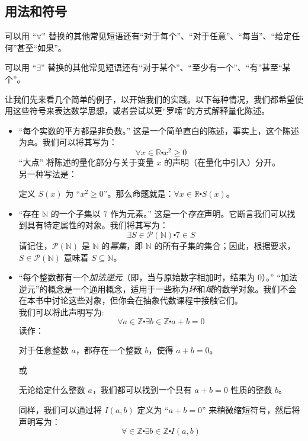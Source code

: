 \subsection{用法和符号}

可以用 ``$\forall$'' 替换的其他常见短语还有``对于每个''、``对于任意''、``每当''、``给定任何''甚至``如果''。

可以用 ``$\exists$'' 替换的其他常见短语还有``对于某个''、``至少有一个''、``有''甚至``某个''。\\

\begin{example}
    让我们先来看几个简单的例子，以开始我们的实践。以下每种情况，我们都希望使用这些符号来表达数学思想，或者尝试以更``罗嗦''的方式解释量化陈述。
    \begin{itemize}
        \item ``每个实数的平方都是非负数。''
            这是一个简单直白的陈述，事实上，这个陈述为\verb|真|。我们可以将其写为：
            \[\forall x \in \mathbb{R} \centerdot x^2 \ge 0\]
            ``大点'' 将陈述的量化部分与关于变量 $x$ 的声明（在量化中引入）分开。\\
            另一种写法是：
            \begin{center}
                定义 $S(x)$ 为 ``$x^2 \ge 0$''。那么命题就是：$\forall x \in \mathbb{R} \centerdot S(x)$。
            \end{center}
        \item ``存在 $\mathbb{N}$ 的一个子集以 $7$ 作为元素。''
            这是一个\emph{存在}声明。它断言我们可以找到具有特定属性的对象。我们将其写为：
            \[\exists S \in \mathcal{P}(\mathbb{N}) \centerdot 7 \in S\]
            请记住，$\mathcal{P}(\mathbb{N})$ 是 $\mathbb{N}$ 的\emph{幂集}，即 $\mathbb{N}$ 的所有子集的集合；因此，根据要求，$S \in \mathcal{P}(\mathbb{N})$ 意味着 $S \subseteq \mathbb{N}$。
        \item ``每个整数都有一个\emph{加法逆元}（即，当与原始数字相加时，结果为 $0$）。''
            ``加法逆元''的概念是一个通用概念，适用于一些称为\emph{环}和\emph{域}的数学对象。我们不会在本书中讨论这些对象，但你会在抽象代数课程中接触它们。\\
            我们可以将此声明写为:
            \[\forall a \in \mathbb{Z} \centerdot \exists b \in \mathbb{Z} \centerdot a + b = 0\]
            读作：
            \begin{center}
                对于任意整数 $a$，都存在一个整数 $b$，使得 $a + b = 0$。
            \end{center}
            或
            \begin{center}
                无论给定什么整数 $a$，我们都可以找到一个具有 $a + b = 0$ 性质的整数 $b$。
            \end{center}
            同样，我们可以通过将 $I(a, b)$ 定义为 ``$a + b = 0$'' 来稍微缩短符号，然后将声明写为：
            \[\forall \in \mathbb{Z} \centerdot \exists b \in \mathbb{Z} \centerdot I(a, b)\]
    \end{itemize}
\end{example}

